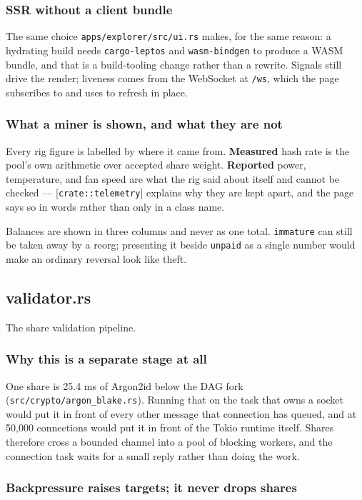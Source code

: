\documentclass[11pt,a4paper]{article}
\begin{document}
\subsubsection{SSR without a client bundle}

The same choice \texttt{apps/explorer/src/ui.rs} makes, for the same reason: a hydrating
build needs \texttt{cargo-leptos} and \texttt{wasm-bindgen} to produce a WASM bundle, and
that is a build-tooling change rather than a rewrite. Signals still drive
the render; liveness comes from the WebSocket at \texttt{/ws}, which the page
subscribes to and uses to refresh in place.

\subsubsection{What a miner is shown, and what they are not}

Every rig figure is labelled by where it came from. \textbf{Measured} hash rate
is the pool's own arithmetic over accepted share weight. \textbf{Reported} power,
temperature, and fan speed are what the rig said about itself and cannot be
checked — [\texttt{crate::telemetry}] explains why they are kept apart, and the
page says so in words rather than only in a class name.

Balances are shown in three columns and never as one total. \texttt{immature} can
still be taken away by a reorg; presenting it beside \texttt{unpaid} as a single
number would make an ordinary reversal look like theft.

\subsection{validator.rs}
The share validation pipeline.

\subsubsection{Why this is a separate stage at all}

One share is 25.4 ms of Argon2id below the DAG fork
(\texttt{src/crypto/argon\_blake.rs}). Running that on the task that owns a socket
would put it in front of every other message that connection has queued, and
at 50,000 connections would put it in front of the Tokio runtime itself.
Shares therefore cross a bounded channel into a pool of blocking workers,
and the connection task waits for a small reply rather than doing the work.

\subsubsection{Backpressure raises targets; it never drops shares}
\end{document}
